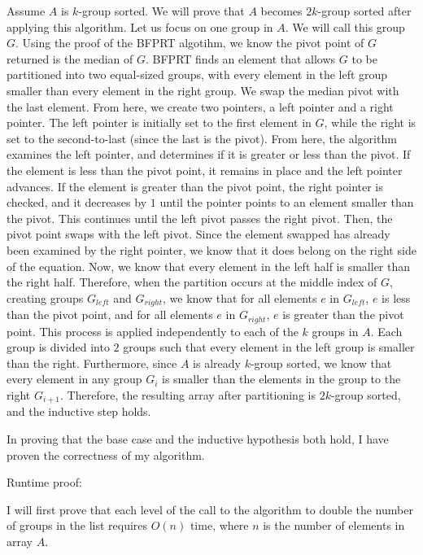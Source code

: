 \documentclass[11pt]{article}
\begin{document}
Assume $A$ is $k$-group sorted. We will prove that $A$ becomes $2k$-group sorted after applying this algorithm. 
Let us focus on one group in $A$. We will call this group $G$. 
Using the proof of the BFPRT algotihm, we know the pivot point of $G$ returned is the median of $G$. 
BFPRT finds an element that allows $G$ to be partitioned into two equal-sized groups, with every element in the left group smaller than every element in the right group. 
We swap the median pivot with the last element. From here, we create two pointers, a left pointer and a right pointer. 
The left pointer is initially set to the first element in $G$, while the right is set to the second-to-last (since the last is the pivot).
From here, the algorithm examines the left pointer, and determines if it is greater or less than the pivot. 
If the element is less than the pivot point, it remains in place and the left pointer advances. 
If the element is greater than the pivot point, the right pointer is checked, and it decreases by $1$ until the pointer points to an element smaller than the pivot.  
This continues until the left pivot passes the right pivot. 
Then, the pivot point swaps with the left pivot. 
Since the element swapped has already been examined by the right pointer, we know that it does belong on the right side of the equation. 
Now, we know that every element in the left half is smaller than the right half. 
Therefore, when the partition occurs at the middle index of $G$, creating groups $G_{left}$ and $G_{right}$, 
we know that for all elements $e$ in $G_{left}$, $e$ is less than the pivot point, 
and for all elements $e$ in $G_{right}$, $e$ is greater than the pivot point. 
This process is applied independently to each of the $k$ groups in $A$. 
Each group is divided into $2$ groups such that every element in the left group is smaller than the right. 
Furthermore, since $A$ is already $k$-group sorted, we know that every element in any group $G_i$ is smaller than the elements in the group to the right $G_{i+1}$. 
Therefore, the resulting array after partitioning is $2k$-group sorted, and the inductive step holds.

In proving that the base case and the inductive hypothesis both hold, I have proven the correctness of my algorithm.

\bigbreak

Runtime proof:

I will first prove that each level of the call to the algorithm to double the number of groups in the list requires $O(n)$ time, 
where $n$ is the number of elements in array $A$.
\end{document}
